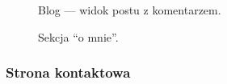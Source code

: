 \documentclass[a4paper, 12pt, twoside]{article}
\numberwithin{figure}{section}
\begin{document}
\begin{sloppypar}
\begin{figure}[H] 
    \centering
   \caption{Blog --- widok postu z komentarzem.}
   \vspace{-3mm}
   \label{fig:gotowa-aplikacja-8.jpg}
\end{figure}

\begin{figure}[H] 
    \centering
   \caption{Sekcja ``o mnie''.}
   \vspace{-3mm}
   \label{fig:gotowa-aplikacja-9.jpg}
\end{figure}

\subsubsection*{Strona kontaktowa}


\end{sloppypar}
\end{document}
